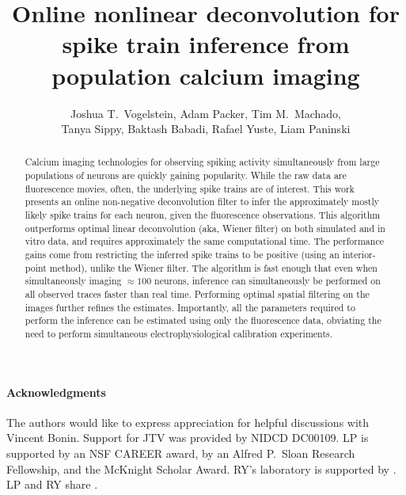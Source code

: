  
\usepackage{multicol}
\usepackage{hyperref}
\newcommand{\zzz}{z}
\newcommand{\az}{\argmax_{\bM \bC \geq \ve{0}}}
\newcommand{\anx}{\argmax_{n_t \in \mathbb{N}_0 \forall t}}
\newcommand{\foopsi}{fast }


\title{Online nonlinear deconvolution for spike train inference from population calcium imaging}

\author{Joshua T.~Vogelstein, Adam Packer, Tim M.~Machado, \\ Tanya Sippy, Baktash Babadi, Rafael Yuste, Liam Paninski}



\maketitle
\begin{abstract}
Calcium imaging technologies for observing spiking activity simultaneously from large populations of neurons are quickly gaining popularity.  While the raw data are fluorescence movies, often, the underlying spike trains are of interest.  This work presents an online non-negative deconvolution filter to infer the approximately mostly likely spike trains for each neuron, given the fluorescence observations.  This algorithm outperforms optimal linear deconvolution (aka, Wiener filter) on both simulated and in vitro data, and requires approximately the same computational time.  The performance gains come from restricting the inferred spike trains to be positive (using an interior-point method), unlike the Wiener filter.  The algorithm is fast enough that even when simultaneously imaging $\approx 100$ neurons, inference can simultaneously be performed on all observed traces faster than real time.  Performing optimal spatial filtering on the images further refines the estimates.  Importantly, all the parameters required to perform the inference can be estimated using only the fluorescence data, obviating the need to perform simultaneous electrophysiological calibration experiments.
\end{abstract}



\paragraph{Acknowledgments}

The authors would like to express appreciation for helpful discussions with Vincent Bonin.  Support for JTV was provided by NIDCD DC00109. LP is supported by an NSF CAREER award, by an Alfred P.\ Sloan Research Fellowship, and the McKnight Scholar Award. RY's laboratory is supported by .  LP and RY share .


%
%

%

\appendix


